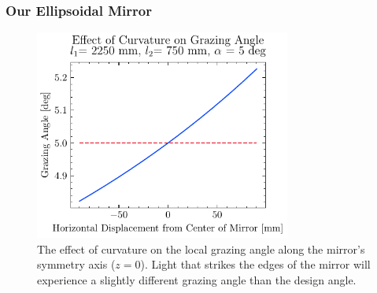 \subsubsection{Our Ellipsoidal Mirror}

\begin{figure}
	\centering
	\includegraphics[width=0.75\textwidth]{figures/chap2/EM_angle.pdf}
	\caption{The effect of curvature on the local grazing angle along the mirror's symmetry axis ($z=0$). Light that strikes the edges of the mirror will experience a slightly different grazing angle than the design angle.}
	\label{fig:EM_angle}
\end{figure}

